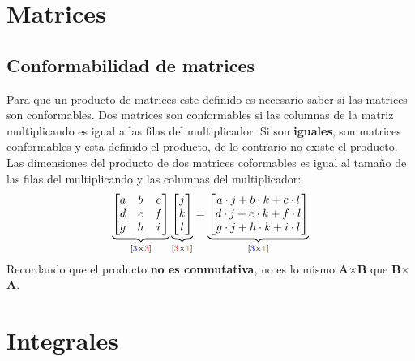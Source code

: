 \documentclass[
	12pt, %
	fleqn, %
	a4paper, %
]{LegrandOrangeBook}
\begin{document}
\chapter{Matrices}
\section{Conformabilidad de matrices}
Para que un producto de matrices este definido es necesario saber si las matrices son conformables. Dos matrices son conformables si las columnas de la matriz multiplicando es igual a las filas del multiplicador. Si son \textbf{iguales}, son matrices conformables y esta definido el producto, de lo contrario no existe el producto. Las dimensiones del producto de dos matrices coformables es igual al tamaño de las filas del multiplicando y las columnas del multiplicador:
\begin{equation}\label{art:matricesconformables}
   \underbrace{\begin{bmatrix}
     a & b & c\\
     d & e & f\\
     g & h & i
   \end{bmatrix}}_{[\textcolor{blue}{3}\times \textcolor{red}{3}]}
   \underbrace{\begin{bmatrix}j \\k\\l \end{bmatrix}}_{[\textcolor{red}{3}\times \textcolor{orange}{1}]}
   =\underbrace{\begin{bmatrix}a\cdot j+b\cdot k +c\cdot l\\d\cdot j+e\cdot k +f\cdot l\\g\cdot j+h\cdot k +i\cdot l
\end{bmatrix}}_{[\textcolor{blue}{3}\times \textcolor{orange}{1}]}
\end{equation}
Recordando que el producto \textbf{no es conmutativa}, no es lo mismo \textbf{A}$\times$\textbf{B} que \textbf{B}$\times$\textbf{A}.
\chapter{Integrales}
\end{document}
